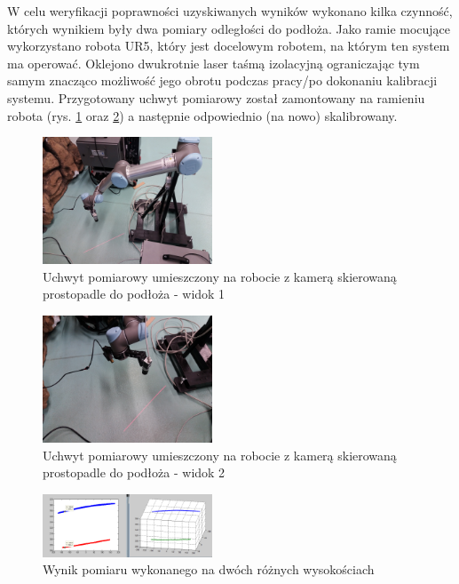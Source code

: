 \documentclass[conference]{IEEEtran}
\begin{document}
W celu weryfikacji poprawności uzyskiwanych wyników wykonano kilka czynność, których wynikiem były dwa pomiary odległości do podłoża. Jako ramie mocujące wykorzystano robota UR5, który jest docelowym robotem, na którym ten system ma operować. Oklejono dwukrotnie laser taśmą izolacyjną ograniczając tym samym znacząco możliwość jego obrotu podczas pracy/po dokonaniu kalibracji systemu. Przygotowany uchwyt pomiarowy został zamontowany na ramieniu robota (rys. \ref{fig:robot_uchwyt} oraz \ref{fig:robot_uchwyt2}) a następnie odpowiednio (na nowo) skalibrowany.

\begin{figure}[ht!]
	\includegraphics[width=0.45\textwidth]{figures/robot_uchwyt.jpg}
	\centering
	\caption{Uchwyt pomiarowy umieszczony na robocie z kamerą skierowaną prostopadle do podłoża - widok 1}
	\label{fig:robot_uchwyt}
\end{figure}

\begin{figure}[ht!]
	\includegraphics[width=0.45\textwidth]{figures/robot_uchwyt2.jpg}
	\centering
	\caption{Uchwyt pomiarowy umieszczony na robocie z kamerą skierowaną prostopadle do podłoża - widok 2}
	\label{fig:robot_uchwyt2}
\end{figure}

\begin{figure}[ht!]
	\includegraphics[width=0.45\textwidth]{figures/wysokosc_pomiar.png}
	\centering
	\caption{Wynik pomiaru wykonanego na dwóch różnych wysokościach}
	\label{fig:wysokosc_pomiar}
\end{figure}
\end{document}
